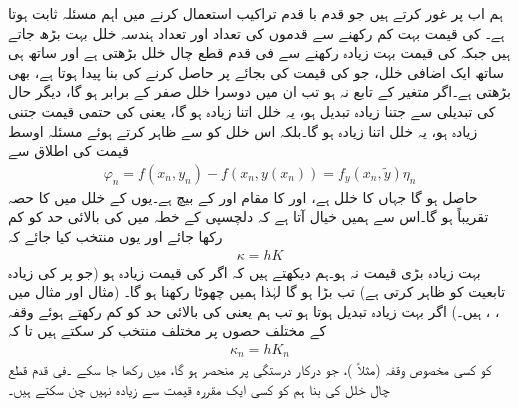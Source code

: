 ہم اب  پر غور کرتے ہیں جو قدم با قدم تراکیب استعمال کرنے میں اہم مسئلہ ثابت ہوتا ہے۔ کی قیمت بہت کم رکھنے سے قدموں کی تعداد اور  تعداد ہندسہ خلل بہت بڑھ جاتے ہیں جبکہ  کی قیمت بہت زیادہ رکھنے سے  فی قدم قطع چال خلل بڑھتی ہے اور ساتھ ہی ساتھ ایک اضافی خلل، جو  کی قیمت  کی بجائے  پر حاصل کرنے کی بنا پیدا ہوتا ہے، بھی بڑھتی  ہے۔اگر  متغیر  کے تابع نہ ہو تب ان میں دوسرا خلل صفر کے برابر ہو گا، دیگر حال  کی تبدیلی سے  جتنا زیادہ تبدیل ہو، یہ خلل اتنا زیادہ ہو گا، یعنی  کی حتمی قیمت جتنی زیادہ ہو، یہ خلل اتنا زیادہ ہو گا۔بلکہ اس خلل کو  سے ظاہر کرتے ہوئے مسئلہ اوسط قیمت کی اطلاق سے 
\begin{align*}
\varphi_n=f(x_n,y_n)-f(x_n,y(x_n))=f_y(x_n,\tilde{y})\eta_n
\end{align*}
حاصل ہو گا جہاں   کا خلل  ہے، اور  کا مقام    اور  کے بیچ ہے۔یوں  کے خلل میں  کا حصہ تقریباً  ہو گا۔اس سے ہمیں خیال آتا ہے کہ دلچسپی کے خطہ میں  کی بالائی حد  کو کم رکھا جائے اور  یوں منتخب کیا جائے کہ
\begin{align*}
\kappa=hK
\end{align*}
بہت زیادہ بڑی قیمت نہ ہو۔ہم دیکھتے ہیں کہ اگر  کی قیمت زیادہ ہو (جو  پر  کی زیادہ تابعیت کو ظاہر کرتی ہے) تب  بڑا ہو گا لہٰذا ہمیں  چھوٹا رکھنا ہو گا۔ (مثال  اور مثال  میں ، ،  ہیں۔) اگر  بہت زیادہ تبدیل ہوتا ہو تب ہم  یعنی  کی بالائی حد کو کم رکھتے ہوئے وقفہ کے مختلف حصوں پر مختلف  منتخب کر سکتے ہیں تا کہ 
\begin{align*}
\kappa_n=hK_n
\end{align*}
کو کسی مخصوص  وقفہ (مثلاً )، جو  درکار درستگی پر منحصر ہو گا،  میں رکھا جا سکے ۔فی قدم قطع چال خلل کی بنا ہم  کو کسی ایک مقررہ  قیمت سے زیادہ نہیں چن سکتے ہیں۔

